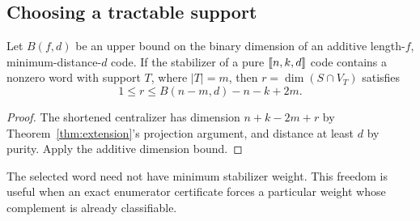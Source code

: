 \subsection{Choosing a tractable support}

\begin{proposition}\label{prop:support}
Let \(B(f,d)\) be an upper bound on the binary dimension of an additive
length-\(f\), minimum-distance-\(d\) code. If the stabilizer of a pure
\([\![n,k,d]\!]\) code contains a nonzero word with support \(T\),
where \(|T|=m\), then \(r=\dim(S\cap V_T)\) satisfies
\[
 1\leq r\leq B(n-m,d)-n-k+2m.
\]
\end{proposition}
\begin{proof}
The shortened centralizer has dimension \(n+k-2m+r\) by
Theorem~\ref{thm:extension}'s projection argument, and distance at least
\(d\) by purity. Apply the additive dimension bound.
\end{proof}

The selected word need not have minimum stabilizer weight. This freedom
is useful when an exact enumerator certificate forces a particular weight
whose complement is already classifiable.
